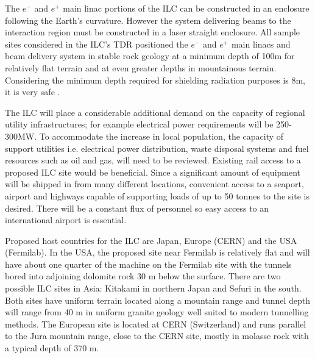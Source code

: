The $e^-$ and $e^+$ main linac portions of the ILC can be constructed in an enclosure following the Earth's curvature. However the system delivering beams to the interaction region must be constructed in a laser straight enclosure. All sample sites considered in the ILC's TDR positioned the $e^-$ and $e^+$ main linacs and beam delivery system in stable rock geology at a minimum depth of 100m for relatively flat terrain and at even greater depths in mountainous terrain. Considering the minimum depth required for shielding radiation purposes is 8m, it is very safe \cite{ILC:PIPReport}.

The ILC will place a considerable additional demand on the capacity of regional utility infrastructures; for example electrical power requirements will be 250-300MW. To accommodate the increase in local population, the capacity of support utilities i.e. electrical power distribution, waste disposal systems and fuel resources such as oil and gas, will need to be reviewed. Existing rail access to a proposed ILC site would be beneficial. Since a significant amount of equipment will be shipped in from many different locations, convenient access to a seaport, airport and highways capable of supporting loads of up to 50 tonnes to the site is desired. There will be a constant flux of personnel so easy access to an international airport is essential.

Proposed host countries for the ILC are Japan, Europe (CERN) and the USA (Fermilab). In the USA, the proposed site near Fermilab is relatively flat and will have about one quarter of the machine on the Fermilab site with the tunnels bored into adjoining dolomite rock 30  m below the surface. There are two possible ILC sites in Asia: Kitakami in northern Japan and Sefuri in the south. Both sites have uniform terrain located along a mountain range and tunnel depth will range from 40  m in uniform granite geology well suited to modern tunnelling methods. The European site is located at CERN (Switzerland) and runs parallel to the Jura mountain range, close to the CERN site, mostly in molasse rock with a typical depth of 370 m. \cite{ILC:TechnicalDesignReport}

